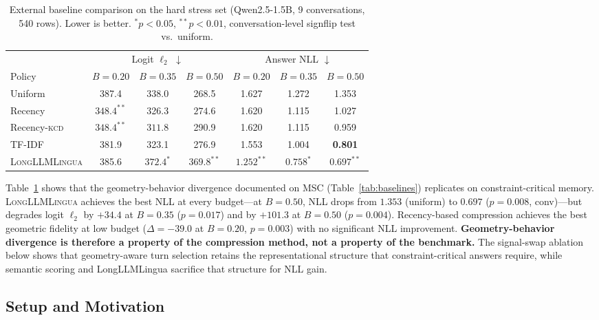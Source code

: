 \documentclass[11pt]{article}
\newcommand{\kcd}{\textsc{kcd}}
\begin{document}
\begin{table}[t]
\centering
\caption{External baseline comparison on the hard stress set
(Qwen2.5-1.5B, 9 conversations, 540 rows). Lower is better.
$^{*}p{<}0.05$, $^{**}p{<}0.01$, conversation-level signflip test vs.\ uniform.}
\label{tab:hardset_baselines}
\setlength{\tabcolsep}{4.5pt}
\begin{tabular}{lcccccc}
\toprule
& \multicolumn{3}{c}{Logit $\ell_2$ $\downarrow$} & \multicolumn{3}{c}{Answer NLL $\downarrow$} \\
\cmidrule(lr){2-4}\cmidrule(lr){5-7}
Policy & $B{=}0.20$ & $B{=}0.35$ & $B{=}0.50$ & $B{=}0.20$ & $B{=}0.35$ & $B{=}0.50$ \\
\midrule
Uniform            & 387.4 & 338.0 & 268.5 & 1.627 & 1.272 & 1.353 \\
Recency            & $\mathbf{348.4}^{**}$ & 326.3 & $\mathbf{274.6}$ & 1.620 & 1.115 & 1.027 \\
Recency-\kcd{}     & $\mathbf{348.4}^{**}$ & $\mathbf{311.8}$ & 290.9 & 1.620 & 1.115 & 0.959 \\
TF-IDF             & 381.9 & 323.1 & 276.9 & 1.553 & 1.004 & \textbf{0.801} \\
\textsc{LongLLMLingua} & 385.6 & $372.4^{*}$ & $369.8^{**}$ & $\mathbf{1.252}^{**}$ & $\mathbf{0.758}^{*}$ & $\mathbf{0.697}^{**}$ \\
\bottomrule
\end{tabular}
\end{table}

Table~\ref{tab:hardset_baselines} shows that the geometry-behavior divergence documented
on MSC (Table~\ref{tab:baselines}) replicates on constraint-critical memory.
\textsc{LongLLMLingua} achieves the best NLL at every budget---at $B{=}0.50$,
NLL drops from $1.353$ (uniform) to $0.697$ ($p{=}0.008$, conv)---but degrades
logit $\ell_2$ by $+34.4$ at $B{=}0.35$ ($p{=}0.017$) and by $+101.3$ at
$B{=}0.50$ ($p{=}0.004$).
Recency-based compression achieves the best geometric fidelity at low budget
($\Delta{=}{-39.0}$ at $B{=}0.20$, $p{=}0.003$) with no significant NLL improvement.
\textbf{Geometry-behavior divergence is therefore a property of the compression
method, not a property of the benchmark.}
The signal-swap ablation below shows that geometry-aware turn selection retains
the representational structure that constraint-critical answers require,
while semantic scoring and LongLLMLingua sacrifice that structure for NLL gain.

\subsection{Setup and Motivation}
\end{document}

